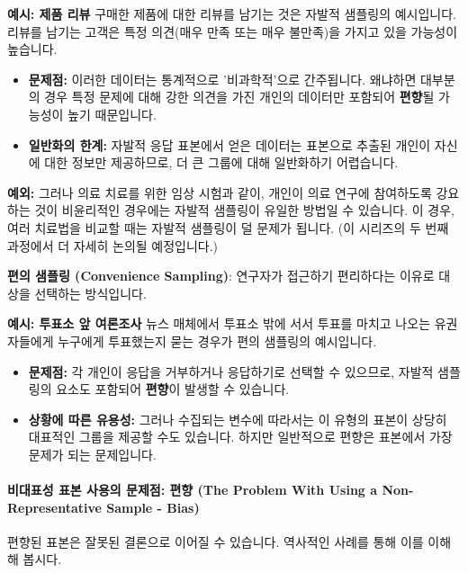 \documentclass[11pt,a4paper]{book}
\newcommand{\concept}[1]{\textbf{#1}}
\theoremstyle{definition}
\begin{document}
\begin{examplebox}
\textbf{예시: 제품 리뷰}
구매한 제품에 대한 리뷰를 남기는 것은 자발적 샘플링의 예시입니다. 리뷰를 남기는 고객은 특정 의견(매우 만족 또는 매우 불만족)을 가지고 있을 가능성이 높습니다.
\begin{itemize}
    \item \textbf{문제점:} 이러한 데이터는 통계적으로 '비과학적'으로 간주됩니다. 왜냐하면 대부분의 경우 특정 문제에 대해 강한 의견을 가진 개인의 데이터만 포함되어 \textbf{편향}될 가능성이 높기 때문입니다.
    \item \textbf{일반화의 한계:} 자발적 응답 표본에서 얻은 데이터는 표본으로 추출된 개인이 자신에 대한 정보만 제공하므로, 더 큰 그룹에 대해 일반화하기 어렵습니다.
\end{itemize}
\textbf{예외:} 그러나 의료 치료를 위한 임상 시험과 같이, 개인이 의료 연구에 참여하도록 강요하는 것이 비윤리적인 경우에는 자발적 샘플링이 유일한 방법일 수 있습니다. 이 경우, 여러 치료법을 비교할 때는 자발적 샘플링이 덜 문제가 됩니다. (이 시리즈의 두 번째 과정에서 더 자세히 논의될 예정입니다.)
\end{examplebox}

\begin{tcolorbox}[infobox, title={비확률 방법 (2/2): 편의 샘플링 (Convenience Sampling)}]
\concept{편의 샘플링 (Convenience Sampling)}: 연구자가 접근하기 편리하다는 이유로 대상을 선택하는 방식입니다.
\end{tcolorbox}

\begin{examplebox}
\textbf{예시: 투표소 앞 여론조사}
뉴스 매체에서 투표소 밖에 서서 투표를 마치고 나오는 유권자들에게 누구에게 투표했는지 묻는 경우가 편의 샘플링의 예시입니다.
\begin{itemize}
    \item \textbf{문제점:} 각 개인이 응답을 거부하거나 응답하기로 선택할 수 있으므로, 자발적 샘플링의 요소도 포함되어 \textbf{편향}이 발생할 수 있습니다.
    \item \textbf{상황에 따른 유용성:} 그러나 수집되는 변수에 따라서는 이 유형의 표본이 상당히 대표적인 그룹을 제공할 수도 있습니다. 하지만 일반적으로 편향은 표본에서 가장 문제가 되는 문제입니다.
\end{itemize}
\end{examplebox}

\paragraph{비대표성 표본 사용의 문제점: 편향 (The Problem With Using a Non-Representative Sample - Bias)}
편향된 표본은 잘못된 결론으로 이어질 수 있습니다. 역사적인 사례를 통해 이를 이해해 봅시다.
\end{document}
